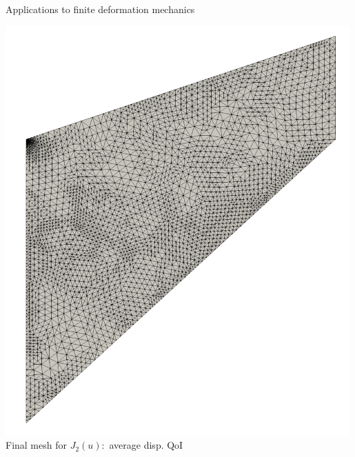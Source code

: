 \documentclass[fleqn]{beamer}
\begin{document}
\begin{frame}{Applications to finite deformation mechanics}
\begin{minipage}{0.5\textwidth}
\includegraphics[width=0.99\textwidth]{../img/mech_cooks_avg_u_final_mesh} \\
Final mesh for $J_2(u):$ average disp. QoI
\end{minipage}
\end{frame}

\end{document}
